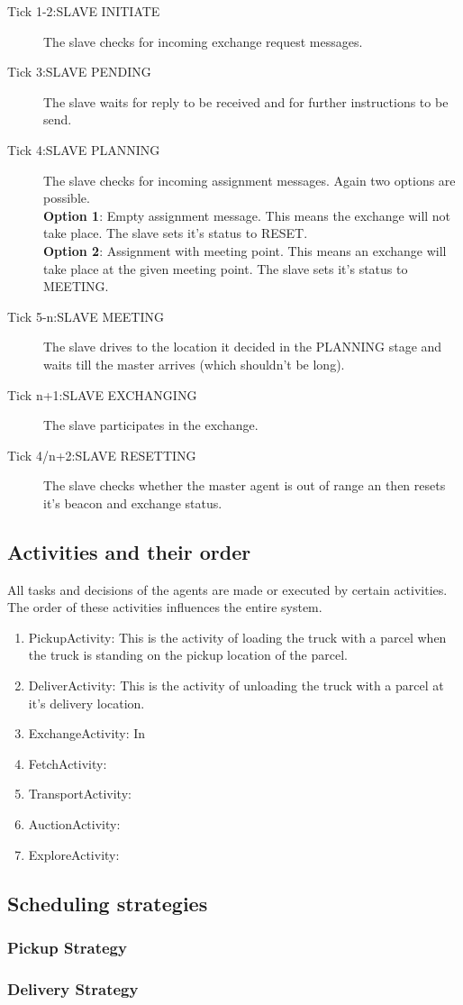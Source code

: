 \documentclass[../main.tex]{subfiles}
\begin{document}
\begin{description}
	\item[Tick 1-2:SLAVE INITIATE]
	The slave checks for incoming exchange request messages.
	\item[Tick 3:SLAVE PENDING]
	The slave waits for reply to be received and for further instructions to be send.
	\item[Tick 4:SLAVE PLANNING]
	The slave checks for incoming assignment messages.
	Again two options are possible.
	\\
	\textbf{Option 1}: Empty assignment message.
	This means the exchange will not take place.
	The slave sets it's status to RESET.
	\\
	\textbf{Option 2}: Assignment with meeting point.
	This means an exchange will take place at the given meeting point.
	The slave sets it's status to MEETING.
	\item[Tick 5-n:SLAVE MEETING]
	The slave drives to the location it decided in the PLANNING stage and waits till the master arrives (which shouldn't be long).
	\item[Tick n+1:SLAVE EXCHANGING] 
	The slave participates in the exchange.
	\item[Tick 4/n+2:SLAVE RESETTING]
	The slave checks whether the master agent is out of range an then resets it's beacon and exchange status.
\end{description}

\subsection{Activities and their order}
All tasks and decisions of the agents are made or executed by certain activities.
The order of these activities influences the entire system. 
\begin{enumerate}
	\item PickupActivity: This is the activity of loading the truck with a parcel when the truck is standing on the pickup location of the parcel.
	\item DeliverActivity: This is the activity of unloading the truck with a parcel at it's delivery location. 
	\item ExchangeActivity: In
	\item FetchActivity: 
	\item TransportActivity: 
	\item AuctionActivity: 
	\item ExploreActivity: 
\end{enumerate}
\subsection{Scheduling strategies}

\subsubsection{Pickup Strategy}
\subsubsection{Delivery Strategy}
\end{document}
